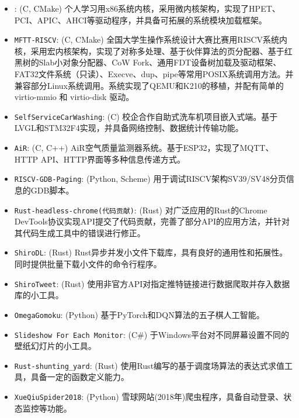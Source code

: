 \documentclass[zh]{resume}
\begin{document}
\begin{itemize}
  \item {}:
	(C, CMake)
	个人学习用x86系统内核，采用微内核架构，实现了HPET、PCI、APIC、AHCI等驱动程序，并具备可拓展的系统模块加载框架。
	\item {} {\texttt{MFTT-RISCV}}:
	(C, CMake)
	全国大学生操作系统设计大赛比赛用RISCV系统内核，采用宏内核架构，实现了对称多处理、基于伙伴算法的页分配器、基于红黑树的Slab小对象分配器、CoW Fork、通用FDT设备树加载及驱动框架、FAT32文件系统（只读）、Execve、dup、pipe等常用POSIX系统调用方法。并兼容部分Linux系统调用。系统实现了QEMU和K210的移植，并配有简单的 virtio-mmio 和 virtio-disk 驱动。
	\item {} {\texttt{SelfServiceCarWashing}}:
	(C)
	校企合作自助式洗车机项目嵌入式端。基于LVGL和STM32F4实现，并具备网络控制、数据统计传输功能。
	\item {} {\texttt{AiR}}:
	(C, C++)
	AiR空气质量监测器系统。基于ESP32，实现了MQTT、HTTP API、HTTP界面等多种信息传递方式。
	\item {} {\texttt{RISCV-GDB-Paging}}:
	(Python, Scheme)
	用于调试RISCV架构SV39/SV48分页信息的GDB脚本。
	\item {} {\texttt{Rust-headless-chrome(代码贡献)}}:
	(Rust)
	对广泛应用的Rust的Chrome DevTools协议实现API提交了代码贡献，完善了部分API的应用方法，并针对其代码生成工具中的错误进行修正。
	\item {} {\texttt{ShiroDL}}:
	(Rust)
	Rust异步并发小文件下载库，具有良好的通用性和拓展性。同时提供批量下载小文件的命令行程序。
	\item {} {\texttt{ShiroTweet}}:	(Rust) 	使用非官方API对指定推特链接进行数据爬取并存入数据库的小工具。
	\item {} {\texttt{OmegaGomoku}}:
	(Python)
	基于PyTorch和DQN算法的五子棋人工智能。
	\item {} {\texttt{Slideshow For Each Monitor}}:
	(C\#)
	于Windows平台对不同屏幕设置不同的壁纸幻灯片的小工具。
	\item {} {\texttt{Rust-shunting\_yard}}:
	(Rust)
	使用Rust编写的基于调度场算法的表达式求值工具，具备一定的函数定义能力。
	\item {} {\texttt{XueQiuSpider2018}}:
	(Python)
	雪球网站(2018年)爬虫程序，具备自动登录、状态监控等功能。
\end{itemize}
\end{document}
